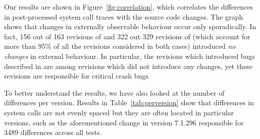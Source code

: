 Our results are shown in Figure~\ref{fig:correlation}, which correlates the
differences in post-processed system call traces with the source code changes.
The graph shows that changes in externally observable behaviour occur only
sporadically.  In fact, 156 out of 163 revisions of \lighttpd and 322 out 329
revisions of \vim (which account for more than 95\% of all the revisions
considered in both cases) introduced \textit{no changes} in external behaviour.
In particular, the revisions which introduced bugs described in
 are among revisions which did not introduce any
changes, yet these revisions are responsible for critical crash bugs.

To better understand the results, we have also looked at the number of
differences per version. Results in Table~\ref{tab:perversion} show that
differences in system calls are not evenly spaced but they are often located
in particular versions, such as the aforementioned change in version 7.1.296
responsible for 3489 differences across all tests.



